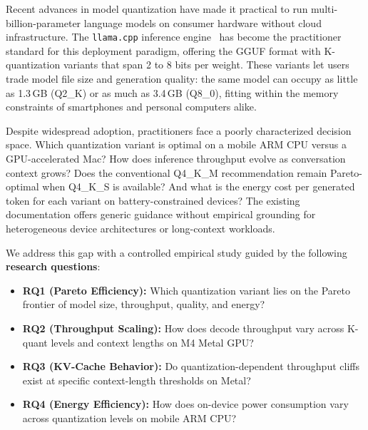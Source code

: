 \documentclass{article}
\begin{document}
Recent advances in model quantization have made it practical to run multi-billion-parameter language models on consumer hardware without cloud infrastructure. The \texttt{llama.cpp} inference engine~\cite{llamacpp} has become the practitioner standard for this deployment paradigm, offering the GGUF format with K-quantization variants that span 2 to 8 bits per weight. These variants let users trade model file size and generation quality: the same model can occupy as little as 1.3\,GB (Q2\_K) or as much as 3.4\,GB (Q8\_0), fitting within the memory constraints of smartphones and personal computers alike.

Despite widespread adoption, practitioners face a poorly characterized decision space. Which quantization variant is optimal on a mobile ARM CPU versus a GPU-accelerated Mac? How does inference throughput evolve as conversation context grows? Does the conventional Q4\_K\_M recommendation remain Pareto-optimal when Q4\_K\_S is available? And what is the energy cost per generated token for each variant on battery-constrained devices? The existing documentation offers generic guidance without empirical grounding for heterogeneous device architectures or long-context workloads.

We address this gap with a controlled empirical study guided by the following \textbf{research questions}:

\begin{itemize}
  \item \textbf{RQ1 (Pareto Efficiency):} Which quantization variant lies on the Pareto frontier of model size, throughput, quality, and energy?
  \item \textbf{RQ2 (Throughput Scaling):} How does decode throughput vary across K-quant levels and context lengths on M4 Metal GPU?
  \item \textbf{RQ3 (KV-Cache Behavior):} Do quantization-dependent throughput cliffs exist at specific context-length thresholds on Metal?
  \item \textbf{RQ4 (Energy Efficiency):} How does on-device power consumption vary across quantization levels on mobile ARM CPU?
\end{itemize}
\end{document}
